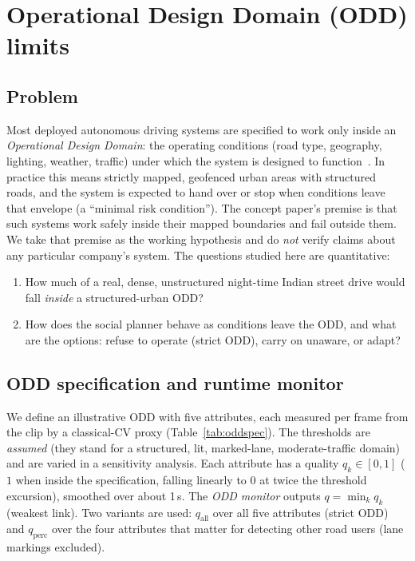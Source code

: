 \section{Operational Design Domain (ODD) limits}\label{sec:odd}
\subsection{Problem}
Most deployed autonomous driving systems are specified to work only inside an \emph{Operational Design Domain}: the operating conditions (road type, geography, lighting, weather, traffic) under which the system is designed to function~\cite{sae}. In practice this means strictly mapped, geofenced urban areas with structured roads, and the system is expected to hand over or stop when conditions leave that envelope (a ``minimal risk condition''). The concept paper's premise is that such systems work safely inside their mapped boundaries and fail outside them. We take that premise as the working hypothesis and do \emph{not} verify claims about any particular company's system. The questions studied here are quantitative:
\begin{enumerate}\setlength\itemsep{0pt}
\item How much of a real, dense, unstructured night-time Indian street drive would fall \emph{inside} a structured-urban ODD?
\item How does the social planner behave as conditions leave the ODD, and what are the options: refuse to operate (strict ODD), carry on unaware, or adapt?
\end{enumerate}

\subsection{ODD specification and runtime monitor}
We define an illustrative ODD with five attributes, each measured per frame from the clip by a classical-CV proxy (Table~\ref{tab:oddspec}). The thresholds are \emph{assumed} (they stand for a structured, lit, marked-lane, moderate-traffic domain) and are varied in a sensitivity analysis. Each attribute has a quality $q_k\in[0,1]$ ($1$ when inside the specification, falling linearly to $0$ at twice the threshold excursion), smoothed over about 1\,s. The \emph{ODD monitor} outputs $q=\min_k q_k$ (weakest link). Two variants are used: $q_{\text{all}}$ over all five attributes (strict ODD) and $q_{\text{perc}}$ over the four attributes that matter for detecting other road users (lane markings excluded).

